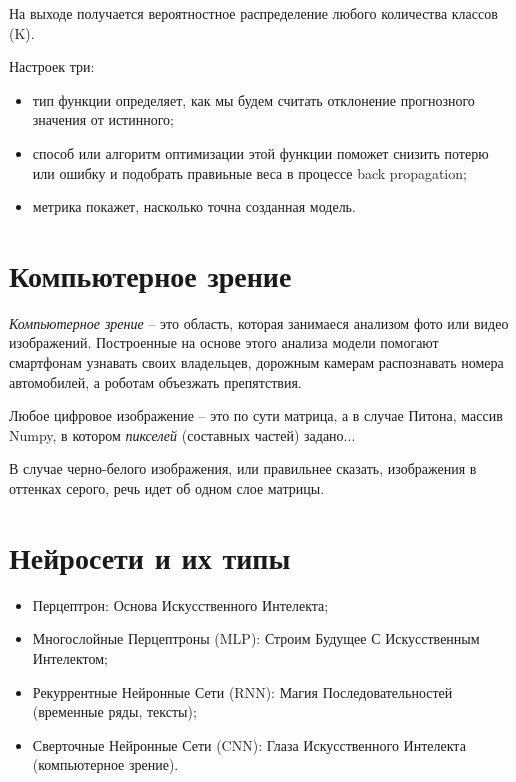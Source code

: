 На выходе получается вероятностное распределение любого количества классов (K).

\begin{note}
  Настроек три:

  \begin{itemize}
    \item тип функции определяет, как мы будем считать отклонение прогнозного значения от истинного;
      \item способ или алгоритм оптимизации этой функции поможет снизить потерю или ошибку и подобрать правиьные веса в процессе back propagation;
        \item метрика покажет, насколько точна созданная модель.
  \end{itemize}
\end{note}

\section{Компьютерное зрение}

\begin{definition}
  \emph{Компьютерное зрение} -- это область, которая занимаеся анализом фото или видео изображений. Построенные на основе этого анализа модели помогают смартфонам узнавать своих владельцев, дорожным камерам распознавать номера автомобилей, а роботам объезжать препятствия.
\end{definition}

\begin{note}
  Любое цифровое изображение -- это по сути матрица, а в случае Питона, массив Numpy, в котором \emph{пикселей} (составных частей) задано...
\end{note}

В случае черно-белого изображения, или правильнее сказать, изображения в оттенках серого, речь идет об одном слое матрицы.

\section{Нейросети и их типы}

\begin{itemize}
  \item Перцептрон: Основа Искусственного Интелекта;
    \item Многослойные Перцептроны (MLP): Строим Будущее С Искусственным Интелектом;
      \item Рекуррентные Нейронные Сети (RNN): Магия Последовательностей (временные ряды, тексты);
        \item Сверточные Нейронные Сети (CNN): Глаза Искусственного Интелекта (компьютерное зрение).
\end{itemize}
